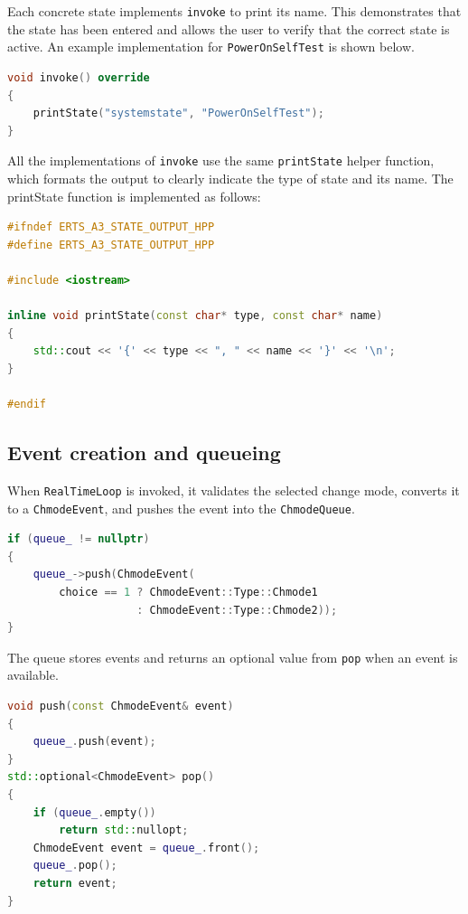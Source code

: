 \documentclass[12pt]{article}
\begin{document}
Each concrete state implements \texttt{invoke} to print its name. This
demonstrates that the state has been entered and allows the user to verify that
the correct state is active. An example implementation for \texttt{PowerOnSelfTest} is shown below.

\begin{lstlisting}[caption={Example implementation of a state's invoke method.}, label={lst:state-invoke}, language={C++}]
void invoke() override
{
    printState("systemstate", "PowerOnSelfTest");
}
\end{lstlisting}

All the implementations of \texttt{invoke} use the same \texttt{printState} helper function, which formats the output to clearly indicate the type of state and its name. The printState function is implemented as follows:

\newpage

\begin{lstlisting}[caption={Helper function for printing state information.}, label={lst:print-state}, language={C++}]
#ifndef ERTS_A3_STATE_OUTPUT_HPP
#define ERTS_A3_STATE_OUTPUT_HPP

#include <iostream>

inline void printState(const char* type, const char* name)
{
    std::cout << '{' << type << ", " << name << '}' << '\n';
}

#endif
\end{lstlisting}


\subsection{Event creation and queueing}

When \texttt{RealTimeLoop} is invoked, it validates the selected change mode,
converts it to a \texttt{ChmodeEvent}, and pushes the event into the
\texttt{ChmodeQueue}.

\begin{lstlisting}[caption={Creation and queueing of a change-mode event.}, label={lst:event-creation}, language={C++}]
if (queue_ != nullptr)
{
    queue_->push(ChmodeEvent(
        choice == 1 ? ChmodeEvent::Type::Chmode1
                    : ChmodeEvent::Type::Chmode2));
}
\end{lstlisting}

The queue stores events and returns an optional value from \texttt{pop} when an
event is available.

\begin{lstlisting}[caption={Queue insertion and optional event retrieval.}, label={lst:event-queue}, language={C++}]
void push(const ChmodeEvent& event)
{
    queue_.push(event);
}
std::optional<ChmodeEvent> pop()
{
    if (queue_.empty())
        return std::nullopt;
    ChmodeEvent event = queue_.front();
    queue_.pop();
    return event;
}
\end{lstlisting}
\end{document}
